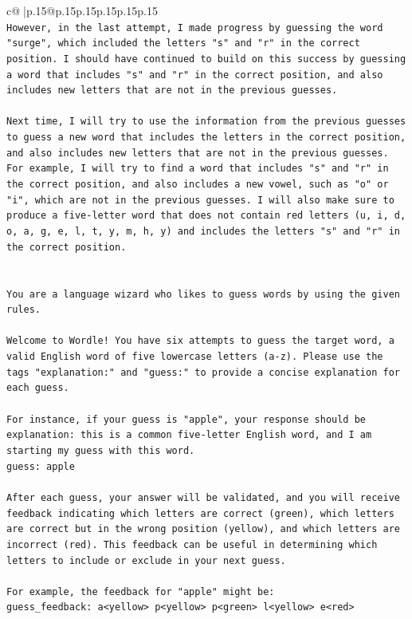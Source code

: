 \documentclass{article}
\begin{document}
{\begin{supertabular}{c@{$\;$}|p{.15\linewidth}@{}p{.15\linewidth}p{.15\linewidth}p{.15\linewidth}p{.15\linewidth}p{.15\linewidth}}
{{{\\ 
\texttt{However, in the last attempt, I made progress by guessing the word "surge", which included the letters "s" and "r" in the correct position. I should have continued to build on this success by guessing a word that includes "s" and "r" in the correct position, and also includes new letters that are not in the previous guesses. } \\
\\ 
\texttt{Next time, I will try to use the information from the previous guesses to guess a new word that includes the letters in the correct position, and also includes new letters that are not in the previous guesses. For example, I will try to find a word that includes "s" and "r" in the correct position, and also includes a new vowel, such as "o" or "i", which are not in the previous guesses. I will also make sure to produce a five{-}letter word that does not contain red letters (u, i, d, o, a, g, e, l, t, y, m, h, y) and includes the letters "s" and "r" in the correct position.} \\
\\ 
\\ 
\texttt{You are a language wizard who likes to guess words by using the given rules.} \\
\\ 
\texttt{Welcome to Wordle! You have six attempts to guess the target word, a valid English word of five lowercase letters (a{-}z). Please use the tags "explanation:" and "guess:" to provide a concise explanation for each guess.} \\
\\ 
\texttt{For instance, if your guess is "apple", your response should be} \\
\texttt{explanation: this is a common five{-}letter English word, and I am starting my guess with this word.} \\
\texttt{guess: apple} \\
\\ 
\texttt{After each guess, your answer will be validated, and you will receive feedback indicating which letters are correct (green), which letters are correct but in the wrong position (yellow), and which letters are incorrect (red). This feedback can be useful in determining which letters to include or exclude in your next guess.} \\
\\ 
\texttt{For example, the feedback for "apple" might be:} \\
\texttt{guess\_feedback: a<yellow> p<yellow> p<green> l<yellow> e<red>} \\
}}}
\end{supertabular}}
\end{document}
